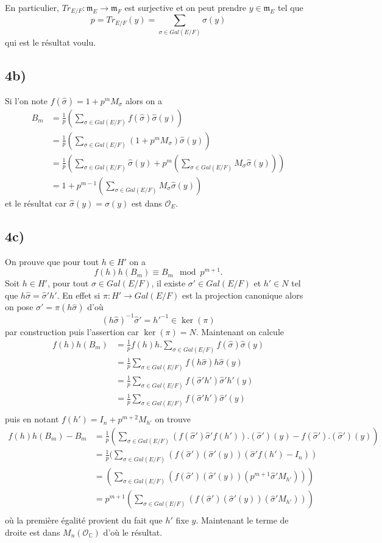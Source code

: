 \documentclass[a4paper,12pt]{article}
\newcommand{\C}{\mathbb{C}}
\newcommand{\Or}{\mathcal{O}}
\newcommand{\m}{\mathfrak m}
\theoremstyle{plain}
\theoremstyle{definition}
\theoremstyle{remark}
\begin{document}
En particulier, $Tr_{E/F} \colon \m_E\to \m_F$ est surjective et 
on peut prendre $y\in \m_E$ tel que 
\[p=Tr_{E/F}(y)=\sum_{\sigma\in Gal(E/F)}\sigma(y)\]
qui est le résultat voulu.

\subsection*{4b)}
Si l'on note $f(\hat\sigma)=1+p^mM_\sigma$ alors on a 
\begin{align*}
  B_m&=\frac{1}{p}\left(\sum_{\sigma\in Gal(E/F)}f(\hat\sigma)\hat\sigma(y)\right)\\
     &=\frac{1}{p}\left(\sum_{\sigma\in Gal(E/F)}(1+p^mM_\sigma)\hat\sigma(y)\right)\\
     &=\frac{1}{p}\left(\sum_{\sigma\in Gal(E/F)}\hat\sigma(y)+p^m\left(\sum_{\sigma\in Gal(E/F)}M_\sigma\hat\sigma(y)\right)\right)\\
     &=1+p^{m-1}\left(\sum_{\sigma\in Gal(E/F)}M_\sigma\hat\sigma(y)\right)
\end{align*}
et le résultat car $\hat\sigma(y)=\sigma(y)$ est dans $\Or_E$.

\subsection*{4c)}
On prouve que pour tout $h\in H'$ on a 
\[f(h)h(B_m)\equiv B_m\mod p^{m+1}.\]
Soit $h\in H'$, pour tout $\sigma\in Gal(E/F)$, il existe
$\sigma'\in Gal(E/F)$ et $h'\in N$ tel que 
$h\hat\sigma=\hat\sigma'h'$.
En effet si $\pi\colon H'\to Gal(E/F)$ est la projection canonique
alors on pose $\sigma'=\pi(h\hat\sigma)$ d'où 
\[(h\hat\sigma)^{-1}\hat\sigma'=h'^{-1}\in \ker(\pi)\]
par construction puis l'assertion car $\ker(\pi)=N$. Maintenant
on calcule
\begin{align*}
  f(h)h(B_m)&=\frac{1}{p}f(h)h.\sum_{\sigma\in Gal(E/F)}f(\hat\sigma)\hat\sigma(y)\\
	    &=\frac{1}{p}\sum_{\sigma\in Gal(E/F)}f(h\hat\sigma)h\hat\sigma(y)\\
	    &=\frac{1}{p}\sum_{\sigma\in Gal(E/F)}f(\hat\sigma'h')\hat\sigma'h'(y)\\
	    &=\frac{1}{p}\sum_{\sigma\in Gal(E/F)}f(\hat\sigma'h')\hat\sigma'(y)\\
\end{align*}
puis en notant $f(h')=I_n+p^{m+2}M_{h'}$ on trouve
\begin{align*}
  f(h)h(B_m)-B_m&=\frac{1}{p}(\sum_{\sigma\in Gal(E/F)}(f(\hat\sigma')\hat\sigma'f(h')).(\hat\sigma')(y)-f(\hat\sigma').(\hat\sigma')(y))\\
		&=\frac{1}{p}(\sum_{\sigma\in Gal(E/F)}\left(f(\hat\sigma')(\hat\sigma'(y))(\hat\sigma'f(h')-I_n)\right)\\
		&=(\sum_{\sigma\in Gal(E/F)}\left(f(\hat\sigma')(\hat\sigma'(y))(p^{m+1}\hat\sigma' M_{h'})\right))\\
		&=p^{m+1}(\sum_{\sigma\in Gal(E/F)}\left(f(\hat\sigma')(\hat\sigma'(y))(\hat\sigma'M_{h'})\right))\\
\end{align*}
où la première égalité provient du fait que $h'$ fixe $y$. 
Maintenant le terme de droite est dans $M_n(\Or_\C)$ d'où le
résultat.
\end{document}
